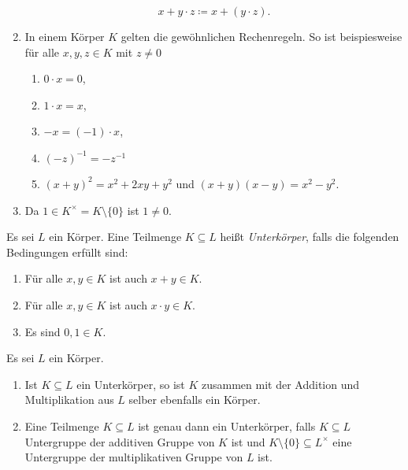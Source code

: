\begin{bem}
\begin{enumerate}[leftmargin=*]
   \[
    x + y \cdot z \coloneqq x + (y \cdot z).
   \]
  \item
   In einem Körper $K$ gelten die gewöhnlichen Rechenregeln. So ist beispiesweise für alle $x,y,z \in K$ mit $z \neq 0$
   \begin{enumerate}[label=\alph*)]
    \item $0 \cdot x = 0$,
    \item $1 \cdot x = x$,
    \item $-x = (-1) \cdot x$,
    \item $(-z)^{-1} = -z^{-1}$
    \item $(x+y)^2 = x^2 + 2xy + y^2$ und $(x+y)(x-y) = x^2 - y^2$.
   \end{enumerate}
  \item
   Da $1 \in K^\times = K \setminus \{0\}$ ist $1 \neq 0$.
 \end{enumerate}
\end{bem}


\begin{defi}
 Es sei $L$ ein Körper. Eine Teilmenge $K \subseteq L$ heißt \emph{Unterkörper}, falls die folgenden Bedingungen erfüllt sind:
 \begin{enumerate}[label=\roman*)]
  \item
   Für alle $x,y \in K$ ist auch $x + y \in K$.
  \item
   Für alle $x,y \in K$ ist auch $x \cdot y \in K$.
  \item
   Es sind $0, 1 \in K$.
 \end{enumerate}
\end{defi}


\begin{bem}
 Es sei $L$ ein Körper.
 \begin{enumerate}[leftmargin=*]
  \item
   Ist $K \subseteq L$ ein Unterkörper, so ist $K$ zusammen mit der Addition und Multiplikation aus $L$ selber ebenfalls ein Körper.
  \item
   Eine Teilmenge $K \subseteq L$ ist genau dann ein Unterkörper, falls $K \subseteq L$ Untergruppe der additiven Gruppe von $K$ ist und $K\setminus\{0\} \subseteq L^\times$ eine Untergruppe der multiplikativen Gruppe von $L$ ist.
 \end{enumerate}
\end{bem}





